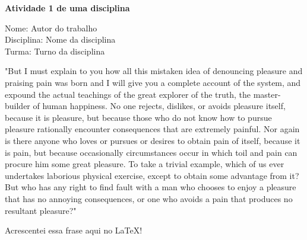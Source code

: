 \documentclass[12pt,a4paper]{article}
\begin{document}
\begin{center}
{\large\textbf{Atividade 1 de uma disciplina}}
\end{center}
\vspace{0.5cm}

\begin{flushleft}
Nome: Autor do trabalho \\
Disciplina: Nome da disciplina\\
Turma: Turno da disciplina
\end{flushleft}

\begin{landscape}
"But I must explain to you how all this mistaken idea of denouncing pleasure and praising pain was born and I will give you a complete account of the system, and expound the actual teachings of the great explorer of the truth, the master-builder of human happiness. No one rejects, dislikes, or avoids pleasure itself, because it is pleasure, but because those who do not know how to pursue pleasure rationally encounter consequences that are extremely painful. Nor again is there anyone who loves or pursues or desires to obtain pain of itself, because it is pain, but because occasionally circumstances occur in which toil and pain can procure him some great pleasure. To take a trivial example, which of us ever undertakes laborious physical exercise, except to obtain some advantage from it? But who has any right to find fault with a man who chooses to enjoy a pleasure that has no annoying consequences, or one who avoids a pain that produces no resultant pleasure?"

Acrescentei essa frase aqui no LaTeX!

\end{landscape}
\end{document}
